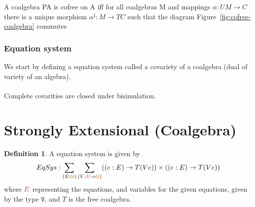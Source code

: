 \documentclass[twoside,11pt,openright]{report}
\theoremstyle{plain} %
\theoremstyle{definition}
\newtheorem{defn}{Definition}[section]
\theoremstyle{remark}
\newcommand*{\figref}[1]{Figure~\ref{fig:#1}}
\newcommand*{\type}[1]{\textcolor{magenta!90!black}{#1}}
\newcommand*{\universe}[1]{\textcolor{orange!80!black}{#1}}
\newcommand*{\typeformer}[1]{\ensuremath{\mathtt{#1}}}
\begin{document}
A coalgebra PA is cofree on A iff for all coalgebras M and mappings \(\alpha : UM \rightarrow C\) there is a unique morphism \(\alpha^\sharp : M \rightarrow TC\) such that the diagram \figref{cofree-coalgebra} commutes

\subsubsection{Equation system}
We start by defining a equation system called a covariety \cite{Hughes} of a coalgebra (dual of variety of an algebra).
\\ \\
Complete covarities are closed under bisimulation.

\section{Strongly Extensional (Coalgebra)}


\begin{defn}
  A equation system is given by
  \begin{equation}
    EqSys : \sum_{(E : \universe{\mathcal{U}})} \sum_{(V : \type{E} \rightarrow \universe{\mathcal{U}})} ((e : E) \rightarrow T (V e)) \times ((e : E) \rightarrow T (V e))
  \end{equation}
  where \(\type{E}\) representing the equations, and variables for the given equations, given by the type \(\typeformer{V}\), and \(T\) is the free coalgebra.
\end{defn}
\end{document}

